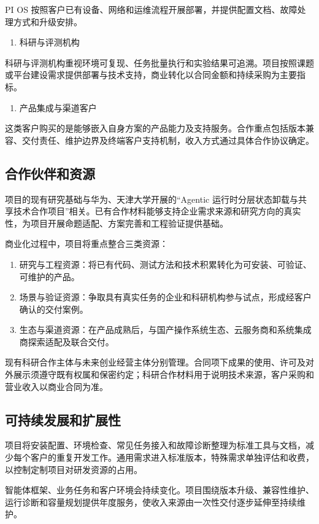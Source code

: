 PI OS 按照客户已有设备、网络和运维流程开展部署，并提供配置文档、故障处理方式和升级安排。

\begin{enumerate}
\item 科研与评测机构
\end{enumerate}
科研与评测机构重视环境可复现、任务批量执行和实验结果可追溯。项目按照课题或平台建设需求提供部署与技术支持，商业转化以合同金额和持续采购为主要指标。

\begin{enumerate}
\item 产品集成与渠道客户
\end{enumerate}
这类客户购买的是能够嵌入自身方案的产品能力及支持服务。合作重点包括版本兼容、交付责任、维护边界及终端客户支持机制，收入方式通过具体合作协议确定。

\subsection{合作伙伴和资源}\label{sec:4.4.3}
项目的现有研究基础与华为、天津大学开展的“Agentic 运行时分层状态卸载与共享技术合作项目”相关。已有合作材料能够支持企业需求来源和研究方向的真实性，为项目开展命题适配、方案完善和工程验证提供基础。

商业化过程中，项目将重点整合三类资源：

\begin{enumerate}
\item 研究与工程资源：将已有代码、测试方法和技术积累转化为可安装、可验证、可维护的产品。
\item 场景与验证资源：争取具有真实任务的企业和科研机构参与试点，形成经客户确认的交付案例。
\item 生态与渠道资源：在产品成熟后，与国产操作系统生态、云服务商和系统集成商探索适配及联合交付。
\end{enumerate}
现有科研合作主体与未来创业经营主体分别管理。合同项下成果的使用、许可及对外展示须遵守既有权属和保密约定；科研合作材料用于说明技术来源，客户采购和营业收入以商业合同为准。

\subsection{可持续发展和扩展性}\label{sec:4.4.4}
项目将安装配置、环境检查、常见任务接入和故障诊断整理为标准工具与文档，减少每个客户的重复开发工作。通用需求进入标准版本，特殊需求单独评估和收费，以控制定制项目对研发资源的占用。

智能体框架、业务任务和客户环境会持续变化。项目围绕版本升级、兼容性维护、运行诊断和容量规划提供年度服务，使收入来源由一次性交付逐步延伸至持续维护。

